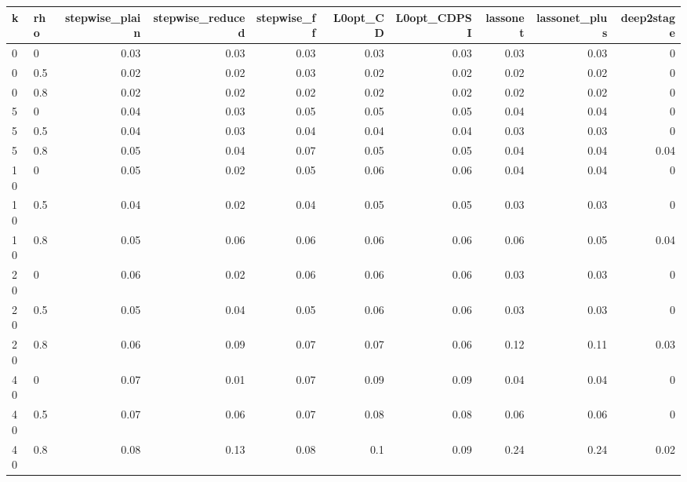 \begin{tabular}{llrrrrrrrr}
\toprule
k & rho & stepwise\_plain & stepwise\_reduced & stepwise\_ff & L0opt\_CD & L0opt\_CDPSI & lassonet & lassonet\_plus & deep2stage \\
\midrule
0 & 0 & 0.03 & 0.03 & 0.03 & 0.03 & 0.03 & 0.03 & 0.03 & 0 \\
0 & 0.5 & 0.02 & 0.02 & 0.03 & 0.02 & 0.02 & 0.02 & 0.02 & 0 \\
0 & 0.8 & 0.02 & 0.02 & 0.02 & 0.02 & 0.02 & 0.02 & 0.02 & 0 \\
5 & 0 & 0.04 & 0.03 & 0.05 & 0.05 & 0.05 & 0.04 & 0.04 & 0 \\
5 & 0.5 & 0.04 & 0.03 & 0.04 & 0.04 & 0.04 & 0.03 & 0.03 & 0 \\
5 & 0.8 & 0.05 & 0.04 & 0.07 & 0.05 & 0.05 & 0.04 & 0.04 & 0.04 \\
10 & 0 & 0.05 & 0.02 & 0.05 & 0.06 & 0.06 & 0.04 & 0.04 & 0 \\
10 & 0.5 & 0.04 & 0.02 & 0.04 & 0.05 & 0.05 & 0.03 & 0.03 & 0 \\
10 & 0.8 & 0.05 & 0.06 & 0.06 & 0.06 & 0.06 & 0.06 & 0.05 & 0.04 \\
20 & 0 & 0.06 & 0.02 & 0.06 & 0.06 & 0.06 & 0.03 & 0.03 & 0 \\
20 & 0.5 & 0.05 & 0.04 & 0.05 & 0.06 & 0.06 & 0.03 & 0.03 & 0 \\
20 & 0.8 & 0.06 & 0.09 & 0.07 & 0.07 & 0.06 & 0.12 & 0.11 & 0.03 \\
40 & 0 & 0.07 & 0.01 & 0.07 & 0.09 & 0.09 & 0.04 & 0.04 & 0 \\
40 & 0.5 & 0.07 & 0.06 & 0.07 & 0.08 & 0.08 & 0.06 & 0.06 & 0 \\
40 & 0.8 & 0.08 & 0.13 & 0.08 & 0.1 & 0.09 & 0.24 & 0.24 & 0.02 \\
\bottomrule
\end{tabular}
